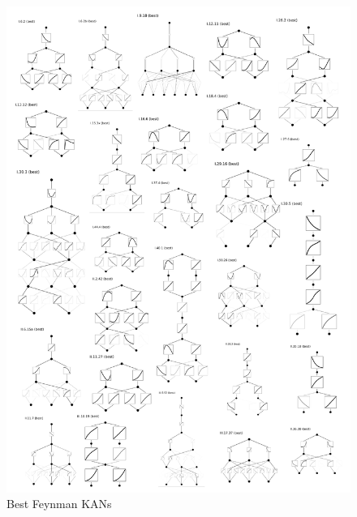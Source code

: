\documentclass{article}
\numberwithin{equation}{section}
\numberwithin{figure}{section}
\begin{document}
\begin{figure}[t]
    \centering
    \includegraphics[width=1\linewidth]{figs/best_feynman_kan.pdf}
    \caption{Best Feynman KANs}
    \label{fig:best-feynman-kan}
\end{figure}
\end{document}
